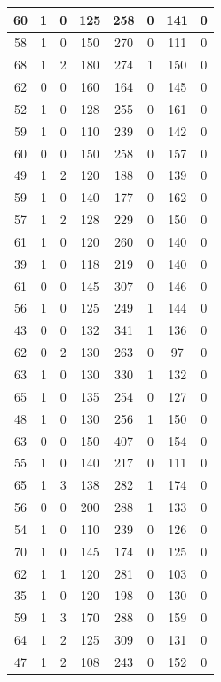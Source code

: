 \documentclass{article}
\begin{document}
\begin{longtable}{|c|c|c|c|c|c|c|c|}
\hline
60 & 1 & 0 & 125 & 258 & 0 & 141 & 0 \\
\hline
58 & 1 & 0 & 150 & 270 & 0 & 111 & 0 \\
\hline
68 & 1 & 2 & 180 & 274 & 1 & 150 & 0 \\
\hline
62 & 0 & 0 & 160 & 164 & 0 & 145 & 0 \\
\hline
52 & 1 & 0 & 128 & 255 & 0 & 161 & 0 \\
\hline
59 & 1 & 0 & 110 & 239 & 0 & 142 & 0 \\
\hline
60 & 0 & 0 & 150 & 258 & 0 & 157 & 0 \\
\hline
49 & 1 & 2 & 120 & 188 & 0 & 139 & 0 \\
\hline
59 & 1 & 0 & 140 & 177 & 0 & 162 & 0 \\
\hline
57 & 1 & 2 & 128 & 229 & 0 & 150 & 0 \\
\hline
61 & 1 & 0 & 120 & 260 & 0 & 140 & 0 \\
\hline
39 & 1 & 0 & 118 & 219 & 0 & 140 & 0 \\
\hline
61 & 0 & 0 & 145 & 307 & 0 & 146 & 0 \\
\hline
56 & 1 & 0 & 125 & 249 & 1 & 144 & 0 \\
\hline
43 & 0 & 0 & 132 & 341 & 1 & 136 & 0 \\
\hline
62 & 0 & 2 & 130 & 263 & 0 & 97 & 0 \\
\hline
63 & 1 & 0 & 130 & 330 & 1 & 132 & 0 \\
\hline
65 & 1 & 0 & 135 & 254 & 0 & 127 & 0 \\
\hline
48 & 1 & 0 & 130 & 256 & 1 & 150 & 0 \\
\hline
63 & 0 & 0 & 150 & 407 & 0 & 154 & 0 \\
\hline
55 & 1 & 0 & 140 & 217 & 0 & 111 & 0 \\
\hline
65 & 1 & 3 & 138 & 282 & 1 & 174 & 0 \\
\hline
56 & 0 & 0 & 200 & 288 & 1 & 133 & 0 \\
\hline
54 & 1 & 0 & 110 & 239 & 0 & 126 & 0 \\
\hline
70 & 1 & 0 & 145 & 174 & 0 & 125 & 0 \\
\hline
62 & 1 & 1 & 120 & 281 & 0 & 103 & 0 \\
\hline
35 & 1 & 0 & 120 & 198 & 0 & 130 & 0 \\
\hline
59 & 1 & 3 & 170 & 288 & 0 & 159 & 0 \\
\hline
64 & 1 & 2 & 125 & 309 & 0 & 131 & 0 \\
\hline
47 & 1 & 2 & 108 & 243 & 0 & 152 & 0 \\

\end{longtable}
\end{document}
